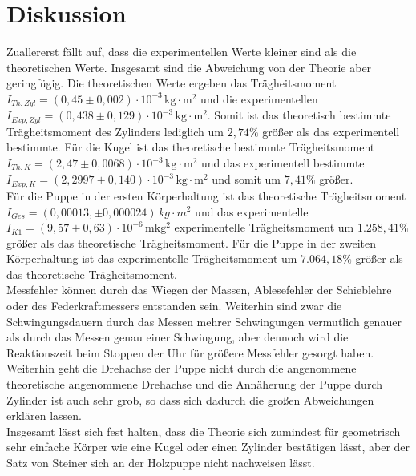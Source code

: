 \newpage
\section{Diskussion}
\label{sec:Diskussion}
Zuallererst fällt auf, dass die experimentellen Werte kleiner sind als die theoretischen Werte.
Insgesamt sind die Abweichung von der Theorie aber geringfügig. Die theoretischen Werte ergeben 
das Trägheitsmoment $I_{Th, Zyl} = \left(0{,}45 \pm 0{,}002 \right) \cdot 10^{-3} \, \mathrm{kg}\cdot\mathrm{m^2}$ und 
die experimentellen $I_{Exp, Zyl} = (0{,}438 \pm 0{,}129)\cdot 10^{-3}\, \mathrm{kg \cdot m^2}$. Somit ist das theoretisch bestimmte Trägheitsmoment
des Zylinders lediglich um $2{,}74\%$ größer als das experimentell bestimmte. Für die Kugel ist das theoretische bestimmte 
Trägheitsmoment $I_{Th, K} = \left(2{,}47 \pm 0{,}0068 \right) \cdot 10^{-3} \, \mathrm{kg}\cdot\mathrm{m^2}$ und das
experimentell bestimmte $I_{Exp, K} = (2{,}2997 \pm 0{,}140)\cdot 10^{-3} \, \mathrm{kg \cdot m^2}$ und somit um $7{,}41\%$ größer.\\
Für die Puppe in der ersten Körperhaltung ist das theoretische Trägheitsmoment $I_{Ges} = (0,00013 ,\pm 0,000024) \, kg \cdot m^2$ und das experimentelle
$I_{K1} = (9{,}57 \pm 0{,}63) \cdot 10^{-6}\, \mathrm{mkg^2}$ experimentelle Trägheitsmoment um $1.258{,}41 \%$ größer als das theoretische Trägheitsmoment.
Für die Puppe in der zweiten Körperhaltung ist das experimentelle Trägheitsmoment um $7.064{,}18 \%$  größer als das theoretische Trägheitsmoment.\\
Messfehler können durch das Wiegen der Massen, Ablesefehler der Schieblehre oder des Federkraftmessers entstanden sein. Weiterhin sind zwar die
Schwingungsdauern durch das Messen mehrer Schwingungen vermutlich genauer als durch das Messen genau einer Schwingung, aber dennoch wird die Reaktionszeit beim 
Stoppen der Uhr für größere Messfehler gesorgt haben.\\
Weiterhin geht die Drehachse der Puppe nicht durch die angenommene theoretische angenommene Drehachse und die Annäherung der Puppe durch Zylinder ist auch sehr grob,
so dass sich dadurch die großen Abweichungen erklären lassen.\\
Insgesamt lässt sich fest halten, dass die Theorie sich zumindest für geometrisch sehr einfache Körper wie eine Kugel oder einen Zylinder bestätigen lässt, aber
der Satz von Steiner sich an der Holzpuppe nicht nachweisen lässt.

\newpage

